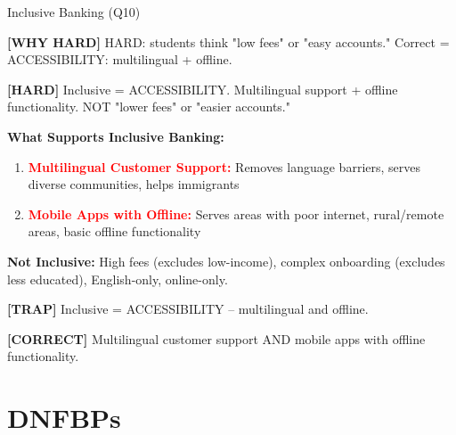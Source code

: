 \documentclass[6pt,aspectratio=169,fontsize=5pt]{beamer}
\renewcommand{\tiny}{\fontsize{3.5pt}{4.5pt}\selectfont}
\renewcommand{\normalsize}{\fontsize{7.5pt}{8.5pt}\selectfont}
\newcommand{\trap}[1]{%
	\begin{block}{\textcolor{redtrap}{\textbf{[TRAP]}}}
		\textcolor{redtrap}{\tiny #1}
	\end{block}
}
\newcommand{\correct}[1]{%
	\begin{block}{\textcolor{greencorrect}{\textbf{[CORRECT]}}}
		\textcolor{greencorrect}{\tiny #1}
	\end{block}
}
\newcommand{\hard}[1]{%
	\begin{block}{\textcolor{hardcolor}{\textbf{[HARD]}}}
		\textcolor{hardcolor}{\tiny #1}
	\end{block}
}
\newcommand{\hardexplain}[1]{%
	\begin{block}{\textcolor{orangehard}{\textbf{[WHY HARD]}}}
		\textcolor{orangehard}{\tiny #1}
	\end{block}
}
\begin{document}
	\begin{frame}{\normalsize Inclusive Banking (Q10)}
		
		\hardexplain{HARD: students think "low fees" or "easy accounts." Correct = ACCESSIBILITY: multilingual + offline.}
		
		\hard{Inclusive = ACCESSIBILITY. Multilingual support + offline functionality. NOT "lower fees" or "easier accounts."}
		
		\textbf{What Supports Inclusive Banking:}
		\begin{enumerate}
			\item \textcolor{red}{\textbf{Multilingual Customer Support:}} Removes language barriers, serves diverse communities, helps immigrants
			\item \textcolor{red}{\textbf{Mobile Apps with Offline:}} Serves areas with poor internet, rural/remote areas, basic offline functionality
		\end{enumerate}
		
		\textbf{Not Inclusive:} High fees (excludes low-income), complex onboarding (excludes less educated), English-only, online-only.
		
		\trap{Inclusive = ACCESSIBILITY -- multilingual and offline.}
		
		\correct{Multilingual customer support AND mobile apps with offline functionality.}
	\end{frame}
	
	\section{DNFBPs}
	
\end{document}
